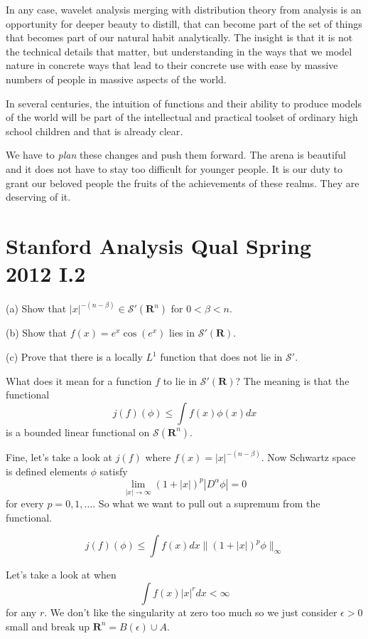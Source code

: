 \documentclass{amsart}
\begin{document}
In any case, wavelet analysis merging with distribution theory from analysis is an opportunity for deeper beauty to distill, that can become part of the set of things that becomes part of our natural habit analytically.  The insight is that it is not the technical details that matter, but understanding in the ways that we model nature in concrete ways that lead to their concrete use with ease by massive numbers of people in massive aspects of the world.

In several centuries, the intuition of functions and their ability to produce models of the world will be part of the intellectual and practical toolset of ordinary high school children and that is already clear.  

We have to {\em plan} these changes and push them forward.  The arena is beautiful and it does not have to stay too difficult for younger people.  It is our duty to grant our beloved people the fruits of the achievements of these realms.  They are deserving of it. 



\section{Stanford Analysis Qual Spring 2012 I.2}

(a) Show that $|x|^{-(n-\beta)} \in \mathcal{S}'(\mathbf{R}^n)$ for $0<\beta<n$.

(b) Show that $f(x) = e^x\cos(e^x)$ lies in $\mathcal{S}'(\mathbf{R})$.

(c) Prove that there is a locally $L^1$ function that does not lie in $\mathcal{S}'$.

What does it mean for a function $f$ to lie in $\mathcal{S}'(\mathbf{R})$?  The meaning is that the functional
\[
j(f)( \phi ) \le \int f(x) \phi(x) dx
\]
is a bounded linear functional on $\mathcal{S}(\mathbf{R}^n)$.  

Fine, let's take a look at $j(f)$ where $f(x) = |x|^{-(n-\beta)}$.  Now Schwartz space is defined elements $\phi$ satisfy
\[
\lim_{|x|\rightarrow \infty} (1+|x|)^p |D^{\alpha} \phi| = 0
\]
for every $p=0,1,\dots$.  So what we want to pull out a supremum from the functional.

\[
j(f)(\phi) \le \int f(x) dx \| (1+|x|)^p \phi \|_{\infty}
\]

Let's take a look at when 
\[
\int f(x) |x|^r dx < \infty
\]
for any $r$.  We don't like the singularity at zero too much so we just consider $\epsilon>0$ small and break up $\mathbf{R}^n= B(\epsilon) \cup A$.
\end{document}
